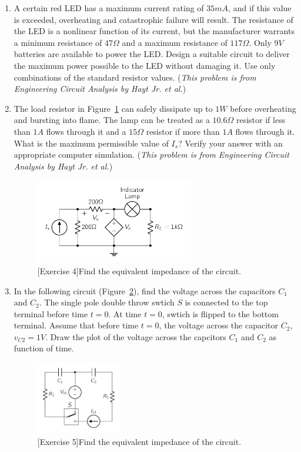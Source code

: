 \begin{enumerate}
    \item A certain red LED has a maximum current rating of $35 mA$, and if this value is exceeded, overheating and catastrophic failure will result. The resistance of the LED is a nonlinear function of its current, but the manufacturer warrants a minimum resistance of $47 \Omega$ and a maximum resistance of $117 \Omega$. Only $9 V$ batteries are available to power the LED. Design a suitable circuit to deliver the maximum power possible to the LED without damaging it. Use only combinations of the standard resistor values. (\textit{This problem is from Engineering Circuit Analysis by Hayt Jr. et al.})
    
    \item The load resistor in Figure~\ref{fig:ex02-03} can safely dissipate up to $1W$ before overheating and bursting into flame. The lamp can be treated as a $10.6\Omega$ resistor if less than $1A$ flows through it and a $15\Omega$ resistor if more than $1A$ flows through it. What is the maximum permissible value of $I_s$? Verify your answer with an appropriate computer simulation. (\textit{This problem is from Engineering Circuit Analysis by Hayt Jr. et al.})
    \begin{figure}[h]
        \centering
        \includegraphics[width=0.65\textwidth]{figure/ch02/ex02-03.pdf}
        \caption{[Exercise 4]Find the equivalent impedance of the circuit.}
        \label{fig:ex02-03}
    \end{figure}
    
    \item In the following circuit (Figure~\ref{fig:ex02-04}), find the voltage across the capacitors $C_1$ and $C_2$. The single pole double throw swtich $S$ is connected to the top terminal before time $t=0$. At time $t=0$, swtich is flipped to the bottom terminal.  Assume that before time $t=0$, the voltage across the capacitor $C_2$, $v_{C2} = 1V$. Draw the plot of the voltage across the capcitors $C_1$ and $C_2$ as function of time.
    \begin{figure}[h]
        \centering
        \includegraphics[width=0.35\textwidth]{figure/ch02/ex02-04.pdf}
        \caption{[Exercise 5]Find the equivalent impedance of the circuit.}
        \label{fig:ex02-04}
    \end{figure}
    

\end{enumerate}
